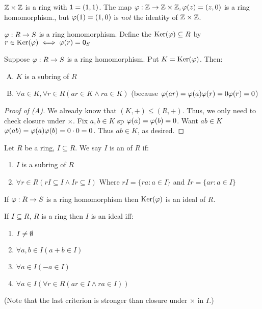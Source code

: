 \documentclass[notes.tex]{subfiles}
\begin{document}
\begin{eg}
	$\mathbb{Z}\times\mathbb{Z}$ is a ring with $\mathsf{1}=(1, 1)$.
	The map $\varphi:\mathbb{Z}\to\mathbb{Z}\times\mathbb{Z}, \varphi(z) = (z, 0)$ is a ring homomorphism., but $\varphi(1) = (1, 0)$ is \emph{not} the identity of $\mathbb{Z}\times\mathbb{Z}$.
\end{eg}

\begin{defn}
	$\varphi:R\to S$ is a ring homomorphism. Define the  $\operatorname{\mathrm{Ker}}(\varphi)\subseteq R$ by $r\in \operatorname{\mathrm{Ker}}(\varphi) \iff \varphi(r) = \mathsf{0}_S$ 
\end{defn}

\begin{proposition}
	Suppose $\varphi:R\to S$ is a ring homomorphism. Put $K=\operatorname{\mathrm{Ker}}(\varphi)$. Then:
	\begin{enumerate}[(A)]
		\item $K$ is a subring of $R$
		\item $\forall a\in K, \forall r\in R (ar\in K \land ra\in K)$ (because $\varphi(ar) = \varphi(a)\varphi(r) = 0\varphi(r) = 0$)
	\end{enumerate}
\end{proposition}
\begin{proof}[Proof of (A)]
	We already know that $(K, +) \le (R, +)$. Thus, we only need to check closure under $\times$.
	Fix $a, b\in K$ sp $\varphi(a) = \varphi(b) = 0$. Want $ab\in K$ $\varphi(ab) = \varphi(a)\varphi(b) = 0\cdot 0 = 0$. Thus $ab\in K$, as desired.
\end{proof}

\begin{defn}
	Let $R$ be a ring, $I\subseteq R$. We say $I$ is an  of $R$ if:
	\begin{enumerate}
		\item $I$ is a subring of $R$
		\item $\forall r\in R (rI\subseteq I \land Ir \subseteq I)$
		Where $rI = \{ra : a\in I\}$ and $Ir = \{ar: a\in I\}$
	\end{enumerate}
\end{defn}

\begin{proposition}
	If $\varphi:R\to S$ is a ring homomorphism then $\operatorname{\mathrm{Ker}}(\varphi)$ is an ideal of $R$.
\end{proposition}

\begin{proposition}
	\label{idealcrit}
	If $I\subseteq R$, $R$ is a ring then $I$ is an ideal iff:
	\begin{enumerate}
		\item $I\ne \emptyset$
		\item $\forall a, b\in I (a+b\in I)$
		\item $\forall a\in I (-a\in I)$
		\item $\forall a\in I (\forall r\in R (ar\in I \land ra \in I))$ 
	\end{enumerate}
\end{proposition}
(Note that the last criterion is stronger than closure under $\times$ in $I$.)
\end{document}
